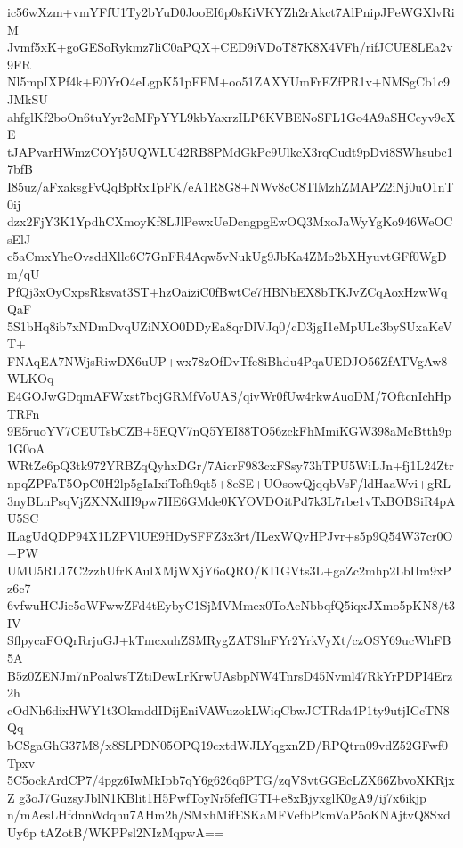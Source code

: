 ic56wXzm+vmYFfU1Ty2bYuD0JooEI6p0sKiVKYZh2rAkct7AlPnipJPeWGXlvRiM
Jvmf5xK+goGESoRykmz7liC0aPQX+CED9iVDoT87K8X4VFh/rifJCUE8LEa2v9FR
Nl5mpIXPf4k+E0YrO4eLgpK51pFFM+oo51ZAXYUmFrEZfPR1v+NMSgCb1c9JMkSU
ahfglKf2boOn6tuYyr2oMFpYYL9kbYaxrzILP6KVBENoSFL1Go4A9aSHCcyv9cXE
tJAPvarHWmzCOYj5UQWLU42RB8PMdGkPc9UlkcX3rqCudt9pDvi8SWhsubc17bfB
I85uz/aFxaksgFvQqBpRxTpFK/eA1R8G8+NWv8cC8TlMzhZMAPZ2iNj0uO1nT0ij
dzx2FjY3K1YpdhCXmoyKf8LJlPewxUeDcngpgEwOQ3MxoJaWyYgKo946WeOCsElJ
c5aCmxYheOvsddXllc6C7GnFR4Aqw5vNukUg9JbKa4ZMo2bXHyuvtGFf0WgDm/qU
PfQj3xOyCxpsRksvat3ST+hzOaiziC0fBwtCe7HBNbEX8bTKJvZCqAoxHzwWqQaF
5S1bHq8ib7xNDmDvqUZiNXO0DDyEa8qrDlVJq0/cD3jgI1eMpULc3bySUxaKeVT+
FNAqEA7NWjsRiwDX6uUP+wx78zOfDvTfe8iBhdu4PqaUEDJO56ZfATVgAw8WLKOq
E4GOJwGDqmAFWxst7bcjGRMfVoUAS/qivWr0fUw4rkwAuoDM/7OftcnIchHpTRFn
9E5ruoYV7CEUTsbCZB+5EQV7nQ5YEI88TO56zckFhMmiKGW398aMcBtth9p1G0oA
WRtZe6pQ3tk972YRBZqQyhxDGr/7AicrF983cxFSsy73hTPU5WiLJn+fj1L24Ztr
npqZPFaT5OpC0H2lp5gIaIxiTofh9qt5+8eSE+UOsowQjqqbVsF/ldHaaWvi+gRL
3nyBLnPsqVjZXNXdH9pw7HE6GMde0KYOVDOitPd7k3L7rbe1vTxBOBSiR4pAU5SC
ILagUdQDP94X1LZPVlUE9HDySFFZ3x3rt/ILexWQvHPJvr+s5p9Q54W37cr0O+PW
UMU5RL17C2zzhUfrKAulXMjWXjY6oQRO/KI1GVts3L+gaZc2mhp2LbIIm9xPz6c7
6vfwuHCJic5oWFwwZFd4tEybyC1SjMVMmex0ToAeNbbqfQ5iqxJXmo5pKN8/t3IV
SflpycaFOQrRrjuGJ+kTmcxuhZSMRygZATSlnFYr2YrkVyXt/czOSY69ucWhFB5A
B5z0ZENJm7nPoalwsTZtiDewLrKrwUAsbpNW4TnrsD45Nvml47RkYrPDPI4Erz2h
cOdNh6dixHWY1t3OkmddIDijEniVAWuzokLWiqCbwJCTRda4P1ty9utjICcTN8Qq
bCSgaGhG37M8/x8SLPDN05OPQ19cxtdWJLYqgxnZD/RPQtrn09vdZ52GFwf0Tpxv
5C5ockArdCP7/4pgz6IwMkIpb7qY6g626q6PTG/zqVSvtGGEcLZX66ZbvoXKRjxZ
g3oJ7GuzsyJblN1KBlit1H5PwfToyNr5fefIGTI+e8xBjyxglK0gA9/ij7x6ikjp
n/mAesLHfdnnWdqhu7AHm2h/SMxhMifESKaMFVefbPkmVaP5oKNAjtvQ8SxdUy6p
tAZotB/WKPPsl2NIzMqpwA==
